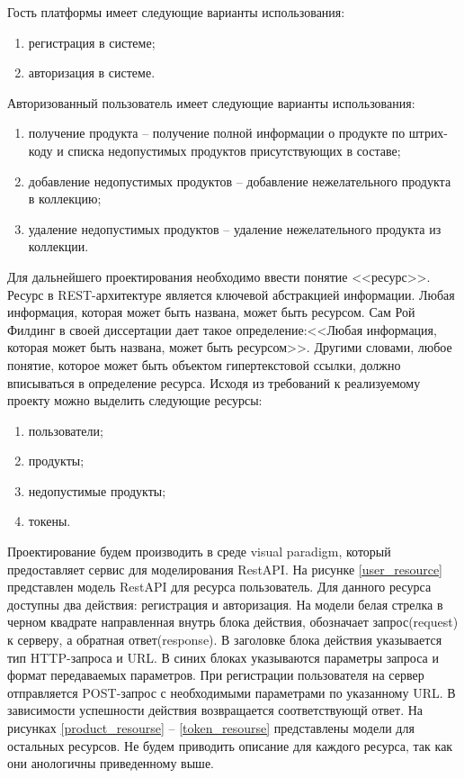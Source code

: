 Гость платформы имеет следующие варианты использования:
\begin{enumerate}
	\item регистрация в системе;
	\item  авторизация в системе.
\end{enumerate}

Авторизованный пользователь имеет следующие варианты использования:
\begin{enumerate}
	\item получение продукта -- получение полной информации о продукте по штрих-коду и списка недопустимых продуктов присутствующих в составе;
	\item добавление недопустимых продуктов -- добавление нежелательного продукта в коллекцию;
	\item удаление недопустимых продуктов -- удаление нежелательного продукта из коллекции.
\end{enumerate}

Для дальнейшего проектирования необходимо ввести понятие <<ресурс>>. Ресурс в REST-архитектуре является ключевой абстракцией информации. Любая информация, которая может быть названа, может быть ресурсом.
Сам Рой Филдинг в своей диссертации дает такое определение:<<Любая информация, которая может быть названа, может быть ресурсом>>. Другими словами, любое понятие, которое может быть объектом гипертекстовой ссылки, должно вписываться в определение ресурса. Исходя из требований к реализуемому проекту можно выделить следующие ресурсы:
\begin{enumerate}
	\item пользователи;
	\item продукты;
	\item недопустимые продукты;
	\item токены.
\end{enumerate}

Проектирование будем производить в среде visual paradigm, который предоставляет сервис для моделирования RestAPI. На рисунке \ref{user_resource} представлен модель RestAPI для ресурса пользователь. Для данного ресурса доступны два действия: регистрация и авторизация. На модели белая стрелка в черном квадрате направленная внутрь блока действия, обозначает запрос(request) к серверу, а обратная ответ(response). В заголовке блока действия указывается тип HTTP-запроса и URL. В синих блоках указываются параметры запроса и формат передаваемых параметров. При регистрации пользователя на сервер отправляется POST-запрос с необходимыми параметрами по указанному URL. В зависимости успешности действия возвращается соответствующй ответ. На рисунках \ref{product_resourse} -- \ref{token_resourse} представлены модели для остальных ресурсов. Не будем приводить описание для каждого ресурса, так как они анологичны приведенному выше.

